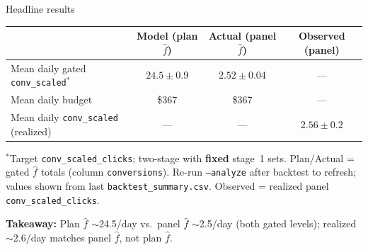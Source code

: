 \documentclass[11pt]{beamer}
\begin{document}
\begin{frame}{Headline results}
  \footnotesize
  \centering
  \begin{tabular}{lccc}
    \toprule
    & \textbf{Model (plan $\hat f$)} & \textbf{Actual (panel $\hat f$)} & \textbf{Observed (panel)} \\
    \midrule
    Mean daily gated \texttt{conv\_scaled}$^\ast$ & $24.5 \pm 0.9$ & $2.52 \pm 0.04$ & --- \\
    Mean daily budget & \$367 & \$367 & --- \\
    Mean daily \texttt{conv\_scaled} (realized) & --- & --- & $2.56 \pm 0.2$ \\
  \bottomrule
  \end{tabular}

  \vspace{0.35em}
  \raggedright
  {\scriptsize $^\ast$Target \texttt{conv\_scaled\_clicks}; two-stage with \textbf{fixed} stage~1 sets. Plan/Actual = gated $\hat f$ totals (column \texttt{conversions}). Re-run \texttt{--analyze} after backtest to refresh; values shown from last \texttt{backtest\_summary.csv}. Observed = realized panel \texttt{conv\_scaled\_clicks}.}

  \vspace{0.25em}
  \normalsize
  \textbf{Takeaway:} Plan $\hat f$ $\sim$24.5/day vs.\ panel $\hat f$ $\sim$2.5/day (both gated levels); realized $\sim$2.6/day matches panel $\hat f$, not plan $\hat f$.
\end{frame}
\end{document}
